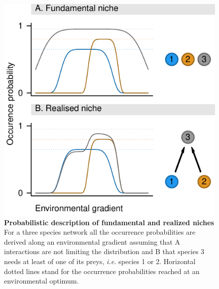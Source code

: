 \begin{figure}[htbp]
\centering
\includegraphics{chapitre3/figConcept.pdf}
\caption{\textbf{Probabilistic description of fundamental and realized
niches} For a three species network all the occurrence probabilities are
derived along an environmental gradient assuming that A interactions are
not limiting the distribution and B that species 3 needs at least of one
of its preys, \emph{i.e.} species 1 or 2. Horizontal dotted lines stand
for the occurrence probabilities reached at an environmental
optimum.\label{fig:box1}}
\end{figure}

\newpage

